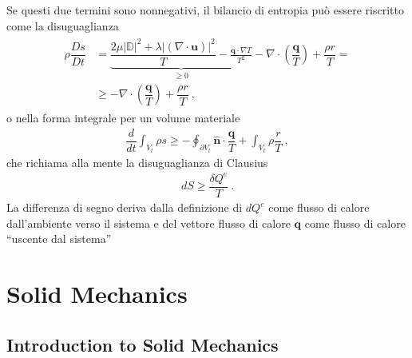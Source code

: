 \documentclass[letterpaper,10pt,english]{jupyterBook}
\begin{document}
\begin{itemize}
\sphinxAtStartPar
Se questi due termini sono non\sphinxhyphen{}negativi, il bilancio di entropia può essere riscritto come la disuguaglianza
\begin{equation*}
\begin{split}\begin{aligned}
    \rho \dfrac{D s}{D t}
    & = \underbrace{\dfrac{2 \mu |\mathbb{D}|^2 + \lambda |(\nabla \cdot \mathbf{u})|^2 }{T} - \frac{\mathbf{q} \cdot \nabla T}{T^2}}_{\ge 0} - \nabla \cdot \left( \dfrac{\mathbf{q}}{T} \right) + \dfrac{\rho r}{T} = \\
    & \ge  - \nabla \cdot \left( \dfrac{\mathbf{q}}{T} \right) + \dfrac{\rho r}{T} \ ,
  \end{aligned}\end{split}
\end{equation*}
\sphinxAtStartPar
o nella forma integrale per un volume materiale
\begin{equation*}
\begin{split}\dfrac{d}{dt} \int_{V_t} \rho s \ge - \oint_{\partial V_t} \mathbf{\hat{n}} \cdot \dfrac{\mathbf{q}}{T} + \int_{V_t} \rho \dfrac{r}{T} \ ,\end{split}
\end{equation*}
\sphinxAtStartPar
che richiama alla mente la disuguaglianza di Clausius  
\begin{equation*}
\begin{split}d S \ge \dfrac{\delta Q^{e}}{T} \ .\end{split}
\end{equation*}
\sphinxAtStartPar
La differenza di segno deriva dalla definizione di \(d Q^e\) come flusso di calore dall’ambiente verso il sistema e del vettore flusso di calore \(\mathbf{q}\) come flusso di calore “uscente dal sistema” 

\end{itemize}

\sphinxstepscope


\part{Solid Mechanics}

\sphinxstepscope


\chapter{Introduction to Solid Mechanics}
\label{\detokenize{ch/solids/intro:introduction-to-solid-mechanics}}\label{\detokenize{ch/solids/intro:solid-mechanics-intro}}\label{\detokenize{ch/solids/intro::doc}}
\sphinxAtStartPar
{}
\end{document}
